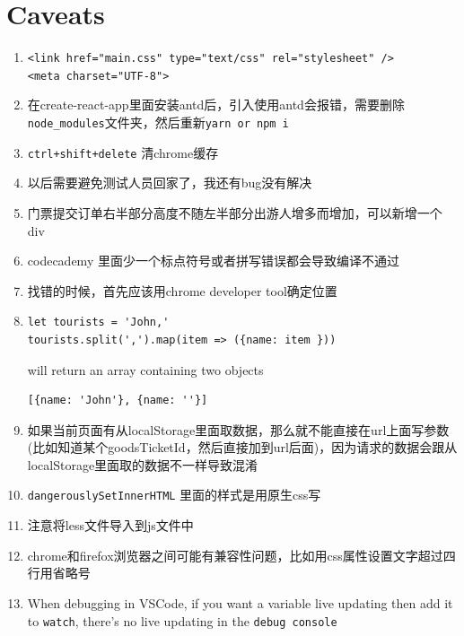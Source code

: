 \documentclass[a4paper, 12pt]{article}
\begin{document}
\section{Caveats}
\begin{enumerate}

\item \verb|<link href="main.css" type="text/css" rel="stylesheet" />|\\
\verb|<meta charset="UTF-8">|

\item 在create-react-app里面安装antd后，引入使用antd会报错，需要删除\verb|node_modules|文件夹，然后重新\verb|yarn or npm i|

\item \verb|ctrl+shift+delete| 清chrome缓存

\item 以后需要避免测试人员回家了，我还有bug没有解决

\item 门票提交订单右半部分高度不随左半部分出游人增多而增加，可以新增一个div

\item codecademy 里面少一个标点符号或者拼写错误都会导致编译不通过

\item 找错的时候，首先应该用chrome developer tool确定位置

\item 
\begin{verbatim}
let tourists = 'John,'
tourists.split(',').map(item => ({name: item }))
\end{verbatim}
will return an array containing two objects
\begin{verbatim}
[{name: 'John'}, {name: ''}]
\end{verbatim}

\item 如果当前页面有从localStorage里面取数据，那么就不能直接在url上面写参数 (比如知道某个goodsTicketId，然后直接加到url后面)，因为请求的数据会跟从localStorage里面取的数据不一样导致混淆

\item \verb|dangerouslySetInnerHTML| 里面的样式是用原生css写

\item 注意将less文件导入到js文件中

\item chrome和firefox浏览器之间可能有兼容性问题，比如用css属性设置文字超过四行用省略号

\item When debugging in VSCode, if you want a variable live updating then add it to \verb|watch|, there's no live updating in the \verb|debug console|


\end{enumerate}
\end{document}
